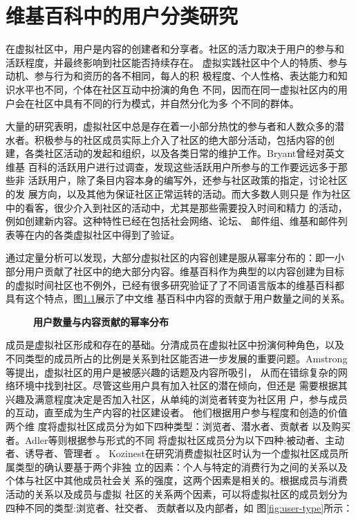 
\chapter{维基百科中的用户分类研究}
\label{cha:user-category}

在虚拟社区中，用户是内容的创建者和分享者。社区的活力取决于用户的参与和
活跃程度，并最终影响到社区能否持续存在。
虚拟实践社区中个人的特质、参与动机、参与行为和资历的各不相同，每人的积
极程度、个人性格、表达能力和知识水平也不同，个体在社区互动中扮演的角色
不同，因而在同一虚拟社区内的用户会在社区中具有不同的行为模式，并自然分化为多
个不同的群体。

大量的研究表明，虚拟社区中总是存在着一小部分热忱的参与者和人数众多的潜
水者。积极参与的社区成员实际上介入了社区的绝大部分活动，包括内容的创
建，各类社区活动的发起和组织，以及各类日常的维护工作。Bryant曾经对英文维基
百科的活跃用户进行过调查，发现这些活跃用户所参与的工作要远远多于那些非
活跃用户，除了条目内容本身的编写外，还参与社区政策的指定，讨论社区的发
展方向，以及其他为保证社区正常运转的活动\cite{1099205}。而大多数人则只是
作为社区中的看客，很少介入到社区的活动中，尤其是那些需要投入时间和精力
的活动，例如创建新内容。这种特性已经在包括社会网络、论坛、
邮件组、维基和邮件列表等在内的各类虚拟社区中得到了验证。

通过定量分析可以发现，大部分虚拟社区的内容创建是服从幂率分布的：即一小
部分用户贡献了社区中的绝大部分内容。维基百科作为典型的以内容创建为目标
的虚拟时间社区也不例外，已经有很多研究验证了了不同语言版本的维基百科都
具有这个特点，图\ref{fig:power-law}展示了中文维
基百科中内容的贡献于用户数量之间的关系。

\begin{figure}
  \centering
 \scalebox{0.4}{ \texttt{[image: 02-3]}}
  \caption{\small{\bf{用户数量与内容贡献的幂率分布}}}
  \label{fig:power-law}
\end{figure}

成员是虚拟社区形成和存在的基础。分清成员在虚拟社区中扮演何种角色，以及
不同类型的成员所占的比例是关系到社区能否进一步发展的重要问题。Amstrong
等提出，虚拟社区的用户是被感兴趣的话题及内容所吸引，
从而在错综复杂的网络环境中找到社区。尽管这些用户具有加入社区的潜在倾向，但还是
需要根据其兴趣及满意程度决定是否加入社区，从单纯的浏览者转变为社区用
户，参与成员的互动，直至成为生产内容的社区建设者\cite{hagel1997net}。
他们根据用户参与程度和创造的价值两个维
度将虚拟社区成员分为如下四种类型：浏览者、潜水者、贡献者
以及购买者。Adler等则根据参与形式的不同
将虚拟社区成员分为以下四种:被动者、主动者、诱导者、管理者
\cite{adler1999icp}。
Kozinest在研究消费虚拟社区时认为一个虚拟社区成员所属类型的确认要基于两个非独
立的因素：个人与特定的消费行为之间的关系以及个体与社区中其他成员社会关
系的强度，这两个因素是相关的。根据成员与消费活动的关系以及成员与虚拟
社区的关系两个因素，可以将虚拟社区的成员划分为四种不同的类型:浏览者、社交者、
贡献者以及内部者，如
图\ref{fig:user-type}所示\cite{kozinets2002field}：


